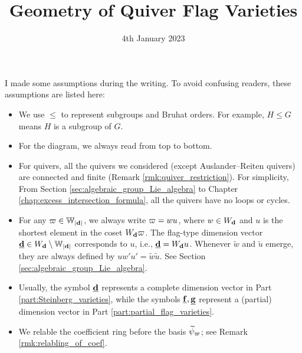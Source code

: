 \date{4th January 2023}


\title{Geometry of Quiver Flag Varieties}

\maketitle
\tableofcontents

\begin{warning}
I made some assumptions during the writing. To avoid confusing readers, these assumptions are listed here:
\begin{itemize}
\item We use $\leqslant$ to represent subgroups and Bruhat orders. For example, $H \leqslant G$ means $H$ is a subgroup of $G$.

\item For the diagram, we always read from top to bottom.

\item For quivers, all the quivers we considered (except Auslander--Reiten quivers) are connected and finite (Remark \ref{rmk:quiver_restriction}). For simplicity, From Section \ref{sec:algebraic_group_Lie_algebra} to Chapter \ref{chap:excess_intersection_formula}, all the quivers have no loops or cycles.

\item  For any $\varpi \in \mathbb{W}_{|\mathbf{d}|}$, we always write $\varpi = wu$, where $w \in W_{\mathbf{d}}$ and $u$ is the shortest element in the coset $W_{\mathbf{d}} \varpi$. The flag-type dimension vector $\underline{\mathbf{d}} \in W_{\mathbf{d}} \setminus \mathbb{W}_{|\mathbf{d}|}$ corresponds to $u$, i.e., $\underline{\mathbf{d}}=W_{\mathbf{d}} u$. Whenever $\tilde{w}$ and $\tilde{u}$ emerge, they are always defined by $uw'u'=\tilde{w}\tilde{u}$. See Section \ref{sec:algebraic_group_Lie_algebra}. 

\item Usually, the symbol $\underline{\mathbf{d}}$ represents a complete   dimension vector in Part \ref{part:Steinberg_varieties}, while the symbols $\underline{\mathbf{f}}, \underline{\mathbf{g}}$ represent a (partial) dimension vector in Part \ref{part:partial_flag_varieties}.

\item We relable the coefficient ring before the basis $\widetilde{\psi}_{\varpi}$; see Remark \ref{rmk:relabling_of_coef}.
\end{itemize}
\end{warning}